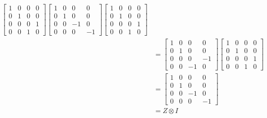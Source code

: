 \begin{examplebox}
\begin{equation}
\begin{aligned}
            \begin{bmatrix}
                1 & 0 & 0 & 0 \\
                0 & 1 & 0 & 0 \\
                0 & 0 & 0 & 1 \\
                0 & 0 & 1 & 0
            \end{bmatrix}
            \begin{bmatrix}
                1 & 0 & 0 & 0 \\
                0 & 1 & 0 & 0 \\
                0 & 0 & -1 & 0 \\
                0 & 0 & 0 & -1
            \end{bmatrix}
            \begin{bmatrix}
                1 & 0 & 0 & 0 \\
                0 & 1 & 0 & 0 \\
                0 & 0 & 0 & 1 \\
                0 & 0 & 1 & 0
            \end{bmatrix} \\
            &=
            \begin{bmatrix}
                1 & 0 & 0 & 0 \\
                0 & 1 & 0 & 0 \\
                0 & 0 & 0 & -1 \\
                0 & 0 & -1 & 0
            \end{bmatrix}
            \begin{bmatrix}
                1 & 0 & 0 & 0 \\
                0 & 1 & 0 & 0 \\
                0 & 0 & 0 & 1 \\
                0 & 0 & 1 & 0
            \end{bmatrix} \\
            &=
            \begin{bmatrix}
                1 & 0 & 0 & 0 \\
                0 & 1 & 0 & 0 \\
                0 & 0 & -1 & 0 \\
                0 & 0 & 0 & -1
            \end{bmatrix} \\
            &=
            Z \otimes I
        \end{aligned}
    \end{equation}

\end{examplebox}
